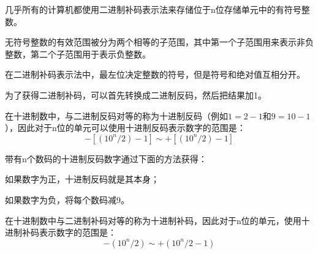 几乎所有的计算机都使用二进制补码表示法来存储位于n位存储单元中的有符号整数。

无符号整数的有效范围被分为两个相等的子范围，其中第一个子范围用来表示非负整数，第二个子范围用于表示负整数。

在二进制补码表示法中，最左位决定整数的符号，但是符号和绝对值互相分开。

为了获得二进制补码，可以首先转换成二进制反码，然后把结果加1。

在十进制数中，与二进制反码对等的称为十进制反码（例如$1=2-1$和$9=10-1$），因此对于n位的单元可以使用十进制反码表示数字的范围是：\[-[(10^n/2)-1]\sim +[(10^n/2)-1]\]

带有n个数码的十进制反码数字通过下面的方法获得：

\begin{compactitem}
\item 如果数字为正，十进制反码就是其本身；
\item 如果数字为负，将每个数码减9。
\end{compactitem}

在十进制数中与二进制补码对等的称为十进制补码，因此对于n位的单元，使用十进制补码表示数字的范围是：\[-(10^n/2)\sim +(10^n/2-1)\]

